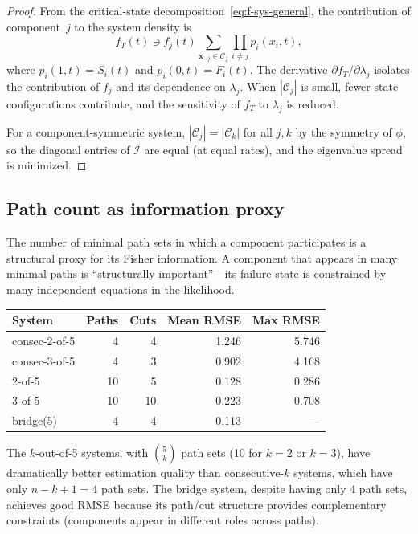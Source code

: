 \documentclass[12pt]{article}
\theoremstyle{definition}
\theoremstyle{remark}
\begin{document}
\begin{proof}
From the critical-state decomposition~\eqref{eq:f-sys-general}, the
contribution of component~$j$ to the system density is
\[
  f_T(t) \ni f_j(t) \sum_{\mathbf{x}_{-j} \in \mathcal{C}_j}
  \prod_{i \neq j} p_i(x_i, t),
\]
where $p_i(1,t) = S_i(t)$ and $p_i(0,t) = F_i(t)$.  The derivative
$\partial f_T / \partial \lambda_j$ isolates the contribution of
$f_j$ and its dependence on $\lambda_j$.  When $|\mathcal{C}_j|$ is
small, fewer state configurations contribute, and the sensitivity of
$f_T$ to $\lambda_j$ is reduced.

For a component-symmetric system,
$|\mathcal{C}_j| = |\mathcal{C}_k|$ for all $j, k$ by the symmetry
of $\phi$, so the diagonal entries of $\mathcal{I}$ are equal (at
equal rates), and the eigenvalue spread is minimized.
\end{proof}

\subsection{Path count as information proxy}
\label{sec:path-count}

The number of minimal path sets in which a component participates is a
structural proxy for its Fisher information.  A component that appears
in many minimal paths is ``structurally important''---its failure state
is constrained by many independent equations in the likelihood.

\begin{center}
\begin{tabular}{lrrrr}
\toprule
System & Paths & Cuts & Mean RMSE & Max RMSE \\
\midrule
consec-2-of-5 & 4 & 4 & 1.246 & 5.746 \\
consec-3-of-5 & 4 & 3 & 0.902 & 4.168 \\
2-of-5 & 10 & 5 & 0.128 & 0.286 \\
3-of-5 & 10 & 10 & 0.223 & 0.708 \\
bridge(5) & 4 & 4 & 0.113 & --- \\
\bottomrule
\end{tabular}
\end{center}

The $k$-out-of-5 systems, with $\binom{5}{k}$ path sets (10 for
$k = 2$ or $k = 3$), have dramatically better estimation quality than
consecutive-$k$ systems, which have only $n - k + 1 = 4$ path sets.
The bridge system, despite having only 4 path sets, achieves good RMSE
because its path/cut structure provides complementary constraints
(components appear in different roles across paths).
\end{document}
